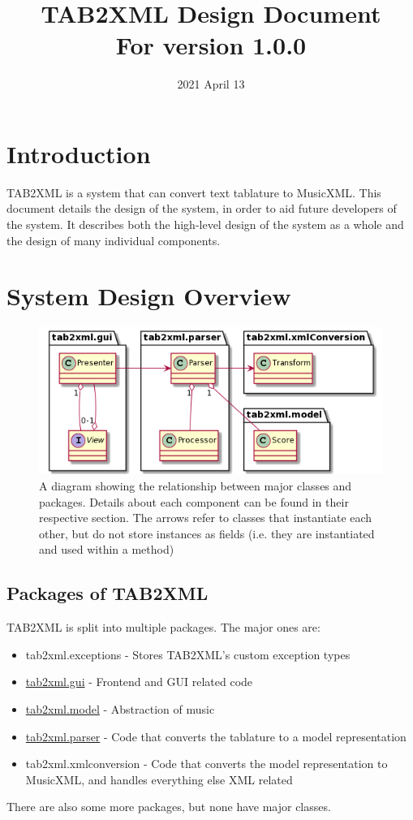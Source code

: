 \documentclass[11pt]{article}
\date{2021 April 13}
\title{TAB2XML Design Document\\\medskip
\large For version 1.0.0}
\begin{document}
\maketitle
\tableofcontents

\newpage

\section{Introduction}
\label{sec:org7a5cdca}
TAB2XML is a system that can convert text tablature to MusicXML.  This document details the design of the system, in order to aid future developers of the system.  It describes both the high-level design of the system as a whole and the design of many individual components.
\section{System Design Overview}
\label{sec:org9bc5c92}
\begin{figure}[htbp]
\centering
\includegraphics[width=.9\linewidth]{./Diagrams/full-system-diagram.png}
\caption{A diagram showing the relationship between major classes and packages.  Details about each component can be found in their respective section.  The arrows refer to classes that instantiate each other, but do not store instances as fields (i.e. they are instantiated and used within a method)}
\end{figure}

\subsection{Packages of TAB2XML}
\label{sec:orgeda408c}
TAB2XML is split into multiple packages.  The major ones are:
\begin{itemize}
\item tab2xml.exceptions - Stores TAB2XML's custom exception types
\item \hyperref[sec:org603a449]{tab2xml.gui} - Frontend and GUI related code
\item \hyperref[sec:org55b6b28]{tab2xml.model} - Abstraction of music
\item \hyperref[sec:org4f461cf]{tab2xml.parser} - Code that converts the tablature to a model representation
\item tab2xml.xmlconversion - Code that converts the model representation to MusicXML, and handles everything else XML related
\end{itemize}
There are also some more packages, but none have major classes.
\end{document}
